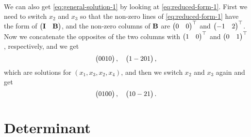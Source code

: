 \documentclass[hyperref, a4paper]{article}
\def\\{}%
\newcommand*{\mat}[1]{\vb{#1}}
\begin{document}
We can also get \eqref{eq:general-solution-1} by looking at \eqref{eq:reduced-form-1}.
First we need to switch $x_2$ and $x_3$ so that the non-zero lines of \eqref{eq:reduced-form-1}
have the form of $\pmqty{\mat{I} & \mat{B}}$,
and the non-zero columns of $\mat{B}$ are 
$\pmqty{0 & 0}^\top$ and $\pmqty{-1 & 2}^\top$.
Now we concatenate the opposites of the two columns 
with $\pmqty{1 & 0}^\top$ and $\pmqty{0 & 1}^\top$, respectively,
and we get 
\[
    \pmqty{0 \\ 0 \\ 1 \\ 0}, \quad \pmqty{1 \\ -2 \\ 0 \\ 1},
\]
which are solutions for $(x_1, x_3, x_2, x_4)$,
and then we switch $x_2$ and $x_3$ again and get 
\[
    \pmqty{0 \\ 1 \\ 0 \\ 0}, \quad \pmqty{1 \\ 0 \\ -2 \\ 1}.
\]

\section{Determinant}
\end{document}
